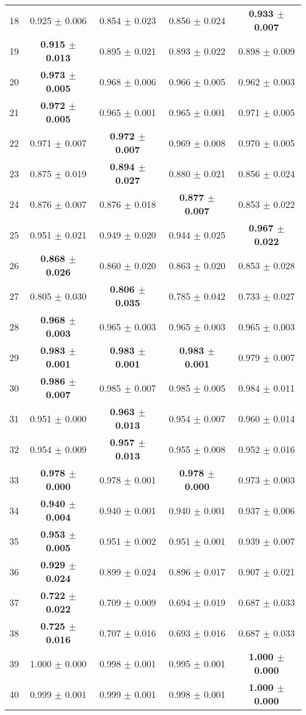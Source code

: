 \begin{table}[!ht]
{\begin{tabular}{r c c c c}
18 & 0.925 $\pm$ 0.006 & 0.854 $\pm$ 0.023 & 0.856 $\pm$ 0.024 & \textbf{0.933 $\pm$ 0.007} \\
19 & \textbf{0.915 $\pm$ 0.013} & 0.895 $\pm$ 0.021 & 0.893 $\pm$ 0.022 & 0.898 $\pm$ 0.009 \\
20 & \textbf{0.973 $\pm$ 0.005} & 0.968 $\pm$ 0.006 & 0.966 $\pm$ 0.005 & 0.962 $\pm$ 0.003 \\
21 & \textbf{0.972 $\pm$ 0.005} & 0.965 $\pm$ 0.001 & 0.965 $\pm$ 0.001 & 0.971 $\pm$ 0.005 \\
22 & 0.971 $\pm$ 0.007 & \textbf{0.972 $\pm$ 0.007} & 0.969 $\pm$ 0.008 & 0.970 $\pm$ 0.005 \\
23 & 0.875 $\pm$ 0.019 & \textbf{0.894 $\pm$ 0.027} & 0.880 $\pm$ 0.021 & 0.856 $\pm$ 0.024 \\
24 & 0.876 $\pm$ 0.007 & 0.876 $\pm$ 0.018 & \textbf{0.877 $\pm$ 0.007} & 0.853 $\pm$ 0.022 \\
25 & 0.951 $\pm$ 0.021 & 0.949 $\pm$ 0.020 & 0.944 $\pm$ 0.025 & \textbf{0.967 $\pm$ 0.022} \\
26 & \textbf{0.868 $\pm$ 0.026} & 0.860 $\pm$ 0.020 & 0.863 $\pm$ 0.020 & 0.853 $\pm$ 0.028 \\
27 & 0.805 $\pm$ 0.030 & \textbf{0.806 $\pm$ 0.035} & 0.785 $\pm$ 0.042 & 0.733 $\pm$ 0.027 \\
28 & \textbf{0.968 $\pm$ 0.003} & 0.965 $\pm$ 0.003 & 0.965 $\pm$ 0.003 & 0.965 $\pm$ 0.003 \\
29 & \textbf{0.983 $\pm$ 0.001} & \textbf{0.983 $\pm$ 0.001} & \textbf{0.983 $\pm$ 0.001} & 0.979 $\pm$ 0.007 \\
30 & \textbf{0.986 $\pm$ 0.007} & 0.985 $\pm$ 0.007 & 0.985 $\pm$ 0.005 & 0.984 $\pm$ 0.011 \\
31 & 0.951 $\pm$ 0.000 & \textbf{0.963 $\pm$ 0.013} & 0.954 $\pm$ 0.007 & 0.960 $\pm$ 0.014 \\
32 & 0.954 $\pm$ 0.009 & \textbf{0.957 $\pm$ 0.013} & 0.955 $\pm$ 0.008 & 0.952 $\pm$ 0.016 \\
33 & \textbf{0.978 $\pm$ 0.000} & 0.978 $\pm$ 0.001 & \textbf{0.978 $\pm$ 0.000} & 0.973 $\pm$ 0.003 \\
34 & \textbf{0.940 $\pm$ 0.004} & 0.940 $\pm$ 0.001 & 0.940 $\pm$ 0.001 & 0.937 $\pm$ 0.006 \\
35 & \textbf{0.953 $\pm$ 0.005} & 0.951 $\pm$ 0.002 & 0.951 $\pm$ 0.001 & 0.939 $\pm$ 0.007 \\
36 & \textbf{0.929 $\pm$ 0.024} & 0.899 $\pm$ 0.024 & 0.896 $\pm$ 0.017 & 0.907 $\pm$ 0.021 \\
37 & \textbf{0.722 $\pm$ 0.022} & 0.709 $\pm$ 0.009 & 0.694 $\pm$ 0.019 & 0.687 $\pm$ 0.033 \\
38 & \textbf{0.725 $\pm$ 0.016} & 0.707 $\pm$ 0.016 & 0.693 $\pm$ 0.016 & 0.687 $\pm$ 0.033 \\
39 & 1.000 $\pm$ 0.000 & 0.998 $\pm$ 0.001 & 0.995 $\pm$ 0.001 & \textbf{1.000 $\pm$ 0.000} \\
40 & 0.999 $\pm$ 0.001 & 0.999 $\pm$ 0.001 & 0.998 $\pm$ 0.001 & \textbf{1.000 $\pm$ 0.000} \\
\end{tabular}}
\end{table}
